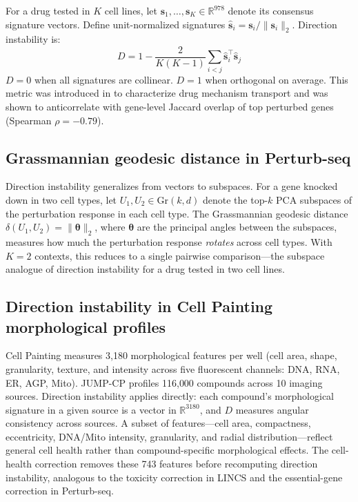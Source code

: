 \documentclass{article}
\begin{document}
For a drug tested in $K$ cell lines, let $\mathbf{s}_1, \ldots,
\mathbf{s}_K \in \mathbb{R}^{978}$ denote its consensus signature vectors.
Define unit-normalized signatures $\hat{\mathbf{s}}_i = \mathbf{s}_i /
\|\mathbf{s}_i\|_2$. Direction instability is:
\begin{equation}
  D = 1 - \frac{2}{K(K-1)} \sum_{i < j}
    \hat{\mathbf{s}}_i^\top \hat{\mathbf{s}}_j
  \label{eq:direction_instability}
\end{equation}
$D = 0$ when all signatures are collinear. $D = 1$ when orthogonal on average.
This metric was introduced in \citet{tower2026bracket} to characterize drug mechanism
transport and was shown to anticorrelate with gene-level Jaccard overlap of
top perturbed genes (Spearman $\rho = -0.79$).

\subsection{Grassmannian geodesic distance in Perturb-seq}

Direction instability generalizes from vectors to subspaces. For a gene
knocked down in two cell types, let $U_1, U_2 \in \text{Gr}(k, d)$ denote
the top-$k$ PCA subspaces of the perturbation response in each cell type.
The Grassmannian geodesic distance $\delta(U_1, U_2) =
\|\boldsymbol{\theta}\|_2$, where $\boldsymbol{\theta}$ are the principal
angles between the subspaces, measures how much the perturbation response
\emph{rotates} across cell types. With $K = 2$ contexts, this reduces to a
single pairwise comparison---the subspace analogue of direction instability
for a drug tested in two cell lines.

\subsection{Direction instability in Cell Painting morphological profiles}

Cell Painting \citep{chandrasekaran2023jump} measures 3{,}180 morphological
features per well (cell area, shape, granularity, texture, and intensity
across five fluorescent channels: DNA, RNA, ER, AGP, Mito). JUMP-CP
profiles 116{,}000 compounds across 10 imaging sources. Direction
instability applies directly: each compound's morphological signature in a
given source is a vector in $\mathbb{R}^{3180}$, and $D$ measures angular
consistency across sources. A subset of features---cell area, compactness,
eccentricity, DNA/Mito intensity, granularity, and radial
distribution---reflect general cell health rather than compound-specific
morphological effects. The cell-health correction removes these 743 features
before recomputing direction instability, analogous to the toxicity
correction in LINCS and the essential-gene correction in Perturb-seq.
\end{document}
